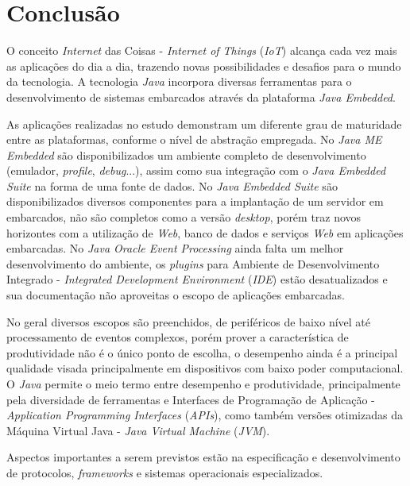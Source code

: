 %

\chapter{Conclusão}

O conceito \textit{Internet} das Coisas - \textit{Internet of Things} 
(\textit{IoT}) alcança cada vez mais as aplicações do
dia a dia, trazendo novas possibilidades e desafios para o mundo da tecnologia.
A tecnologia \textit{Java} incorpora diversas ferramentas para o
desenvolvimento de sistemas embarcados através da plataforma \textit{Java
  Embedded}.

As aplicações realizadas no estudo demonstram um diferente grau de maturidade 
entre as plataformas, conforme o nível de abstração empregada.
No \textit{Java ME Embedded} são disponibilizados um ambiente completo de 
desenvolvimento (emulador, \textit{profile}, \textit{debug}...), assim como sua 
integração com o \textit{Java Embedded Suite} na forma de uma fonte de dados.
No \textit{Java Embedded Suite} são disponibilizados diversos componentes para a 
implantação de um servidor em embarcados, não são completos como a versão 
\textit{desktop}, porém traz novos horizontes com a utilização de \textit{Web}, 
banco de dados e serviços \textit{Web} em aplicações embarcadas.
No \textit{Java Oracle Event Processing} ainda falta um melhor desenvolvimento 
do ambiente, os \textit{plugins} para Ambiente de Desenvolvimento Integrado - 
\textit{Integrated Development Environment} (\textit{IDE}) estão desatualizados 
e sua documentação não aproveitas o escopo de aplicações embarcadas.

No geral diversos escopos são preenchidos, de periféricos de baixo nível até
processamento de eventos complexos, porém prover a característica de
produtividade não é o único ponto de escolha, o desempenho ainda é a principal
qualidade visada principalmente em dispositivos com baixo poder computacional.
O \textit{Java} permite o meio termo entre desempenho e produtividade, 
principalmente
pela diversidade de ferramentas e Interfaces de Programação de Aplicação -
\textit{Application Programming Interfaces} (\textit{APIs}), como também
versões otimizadas da Máquina Virtual Java - \textit{Java Virtual Machine}
(\textit{JVM}).

Aspectos importantes a serem previstos estão na especificação e desenvolvimento
de protocolos, \textit{frameworks} e sistemas operacionais especializados.

